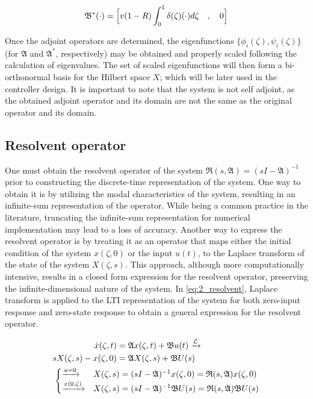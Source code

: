 \begin{equation} \label{eq:2_adjoint_B}
    \mathfrak{B}^* (\cdot) = \Bigl[ v(1-R) \int_0^1 \delta(\zeta) (\cdot) d\zeta \quad , \quad 0 \Bigr]
\end{equation}

Once the adjoint operators are determined, the eigenfunctions $\{ {\phi_i}(\zeta), {\psi_i}(\zeta) \}$ (for $\mathfrak{A}$ and $\mathfrak{A}^*$, respectively) may be obtained and properly scaled following the calculation of eigenvalues. The set of scaled eigenfunctions will then form a bi-orthonormal basis for the Hilbert space $X$; which will be later used in the controller design. It is important to note that the system is not self adjoint, as the obtained adjoint operator and its domain are not the same as the original operator and its domain.

\subsection{Resolvent operator}

One must obtain the resolvent operator of the system $\mathfrak{R}(s, \mathfrak{A}) = (sI-\mathfrak{A})^{-1}$ prior to constructing the discrete-time representation of the system. One way to obtain it is by utilizing the modal characteristics of the system, resulting in an infinite-sum representation of the operator. While being a common practice in the literature, truncating the infinite-sum representation for numerical implementation may lead to a loss of accuracy. Another way to express the resolvent operator is by treating it as an operator that maps either the initial condition of the system ${x}(\zeta,0)$ or the input $u(t)$, to the Laplace transform of the state of the system ${X}(\zeta, s)$. This approach, although more computationally intensive, results in a closed form expression for the resolvent operator, preserving the infinite-dimensional nature of the system. In \eqref{eq:2_resolvent}, Laplace transform is applied to the LTI representation of the system for both zero-input response and zero-state response to obtain a general expression for the resolvent operator.

\begin{equation} \label{eq:2_resolvent}
    \begin{aligned}
        \dot{{x}}(\zeta, t) &= \mathfrak{A} {x}(\zeta, t) + \mathfrak{B} u(t) \xrightarrow{\mathcal{L}}\\
        s {X}(\zeta,s) - {x}(\zeta,0) &= \mathfrak{A} {X}(\zeta,s) + \mathfrak{B} U(s)\\
        &\hspace{-7.5em}\begin{cases}
            \xrightarrow{u = 0} &{X}(\zeta,s) = (sI - \mathfrak{A})^{-1} {x}(\zeta,0) = \mathfrak{R}(s, \mathfrak{A}) {x}(\zeta,0)\\
            \xrightarrow{{x}(0, \zeta)}& {X}(\zeta,s) = (sI - \mathfrak{A})^{-1} \mathfrak{B} U(s) = \mathfrak{R}(s, \mathfrak{A}) \mathfrak{B} U(s)
        \end{cases}
    \end{aligned}
    \end{equation}
    
